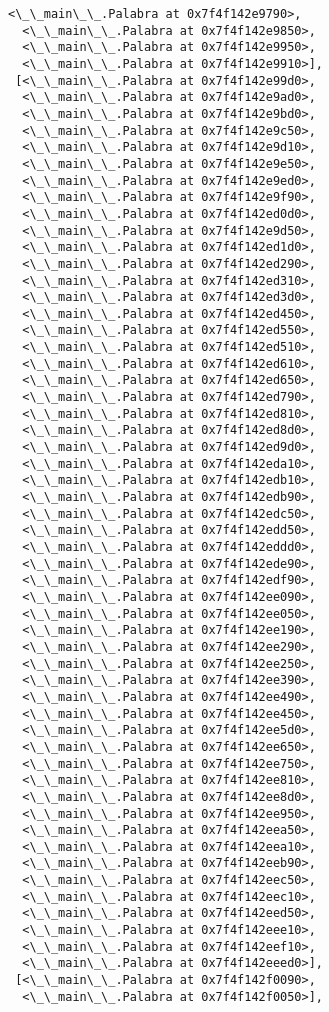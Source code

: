 \documentclass[12pt,a4paper,table]{article}
\begin{document}
\begin{tcolorbox}[breakable, size=fbox, boxrule=.5pt, pad at break*=1mm, opacityfill=0]
\begin{Verbatim}[commandchars=\\\{\}]
  <\_\_main\_\_.Palabra at 0x7f4f142e9790>,
  <\_\_main\_\_.Palabra at 0x7f4f142e9850>,
  <\_\_main\_\_.Palabra at 0x7f4f142e9950>,
  <\_\_main\_\_.Palabra at 0x7f4f142e9910>],
 [<\_\_main\_\_.Palabra at 0x7f4f142e99d0>,
  <\_\_main\_\_.Palabra at 0x7f4f142e9ad0>,
  <\_\_main\_\_.Palabra at 0x7f4f142e9bd0>,
  <\_\_main\_\_.Palabra at 0x7f4f142e9c50>,
  <\_\_main\_\_.Palabra at 0x7f4f142e9d10>,
  <\_\_main\_\_.Palabra at 0x7f4f142e9e50>,
  <\_\_main\_\_.Palabra at 0x7f4f142e9ed0>,
  <\_\_main\_\_.Palabra at 0x7f4f142e9f90>,
  <\_\_main\_\_.Palabra at 0x7f4f142ed0d0>,
  <\_\_main\_\_.Palabra at 0x7f4f142e9d50>,
  <\_\_main\_\_.Palabra at 0x7f4f142ed1d0>,
  <\_\_main\_\_.Palabra at 0x7f4f142ed290>,
  <\_\_main\_\_.Palabra at 0x7f4f142ed310>,
  <\_\_main\_\_.Palabra at 0x7f4f142ed3d0>,
  <\_\_main\_\_.Palabra at 0x7f4f142ed450>,
  <\_\_main\_\_.Palabra at 0x7f4f142ed550>,
  <\_\_main\_\_.Palabra at 0x7f4f142ed510>,
  <\_\_main\_\_.Palabra at 0x7f4f142ed610>,
  <\_\_main\_\_.Palabra at 0x7f4f142ed650>,
  <\_\_main\_\_.Palabra at 0x7f4f142ed790>,
  <\_\_main\_\_.Palabra at 0x7f4f142ed810>,
  <\_\_main\_\_.Palabra at 0x7f4f142ed8d0>,
  <\_\_main\_\_.Palabra at 0x7f4f142ed9d0>,
  <\_\_main\_\_.Palabra at 0x7f4f142eda10>,
  <\_\_main\_\_.Palabra at 0x7f4f142edb10>,
  <\_\_main\_\_.Palabra at 0x7f4f142edb90>,
  <\_\_main\_\_.Palabra at 0x7f4f142edc50>,
  <\_\_main\_\_.Palabra at 0x7f4f142edd50>,
  <\_\_main\_\_.Palabra at 0x7f4f142eddd0>,
  <\_\_main\_\_.Palabra at 0x7f4f142ede90>,
  <\_\_main\_\_.Palabra at 0x7f4f142edf90>,
  <\_\_main\_\_.Palabra at 0x7f4f142ee090>,
  <\_\_main\_\_.Palabra at 0x7f4f142ee050>,
  <\_\_main\_\_.Palabra at 0x7f4f142ee190>,
  <\_\_main\_\_.Palabra at 0x7f4f142ee290>,
  <\_\_main\_\_.Palabra at 0x7f4f142ee250>,
  <\_\_main\_\_.Palabra at 0x7f4f142ee390>,
  <\_\_main\_\_.Palabra at 0x7f4f142ee490>,
  <\_\_main\_\_.Palabra at 0x7f4f142ee450>,
  <\_\_main\_\_.Palabra at 0x7f4f142ee5d0>,
  <\_\_main\_\_.Palabra at 0x7f4f142ee650>,
  <\_\_main\_\_.Palabra at 0x7f4f142ee750>,
  <\_\_main\_\_.Palabra at 0x7f4f142ee810>,
  <\_\_main\_\_.Palabra at 0x7f4f142ee8d0>,
  <\_\_main\_\_.Palabra at 0x7f4f142ee950>,
  <\_\_main\_\_.Palabra at 0x7f4f142eea50>,
  <\_\_main\_\_.Palabra at 0x7f4f142eea10>,
  <\_\_main\_\_.Palabra at 0x7f4f142eeb90>,
  <\_\_main\_\_.Palabra at 0x7f4f142eec50>,
  <\_\_main\_\_.Palabra at 0x7f4f142eec10>,
  <\_\_main\_\_.Palabra at 0x7f4f142eed50>,
  <\_\_main\_\_.Palabra at 0x7f4f142eee10>,
  <\_\_main\_\_.Palabra at 0x7f4f142eef10>,
  <\_\_main\_\_.Palabra at 0x7f4f142eeed0>],
 [<\_\_main\_\_.Palabra at 0x7f4f142f0090>,
  <\_\_main\_\_.Palabra at 0x7f4f142f0050>],

\end{Verbatim}
\end{tcolorbox}
\end{document}
